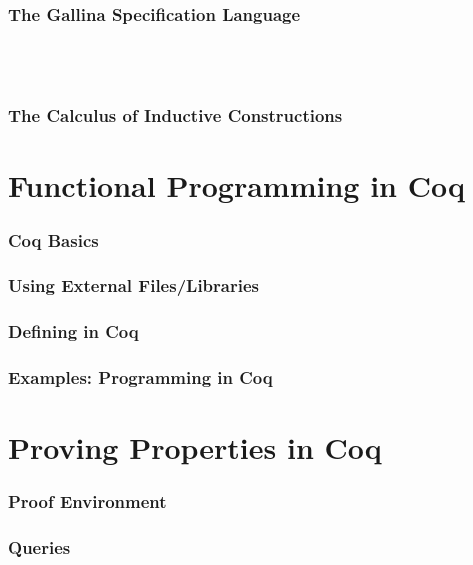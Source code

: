 \documentclass{article}
\begin{document}
\newpage
\section{The Gallina Specification Language}
	\label{Sec: gallina}
	
	
~\\~\\
\section{The Calculus of Inductive Constructions}
	\label{Sec: calculus}
	
	

\newpage
\part{Functional Programming in Coq}
	\label{Part: program}
\section{Coq Basics}
	\label{Sec: basics}
	


\newpage
\section{Using External Files/Libraries}
	\label{Sec: files}
	


\newpage
\section{Defining in Coq}
	\label{Sec: defining}
	

\newpage
\section{Examples: Programming in Coq}
	\label{Sec: program examples}
	


\newpage
\part{Proving Properties in Coq}
	\label{Part: prove}
\section{Proof Environment}
	\label{Sec: env}
	


\newpage
\section{Queries}
	\label{Sec: queries}
	
\end{document}
